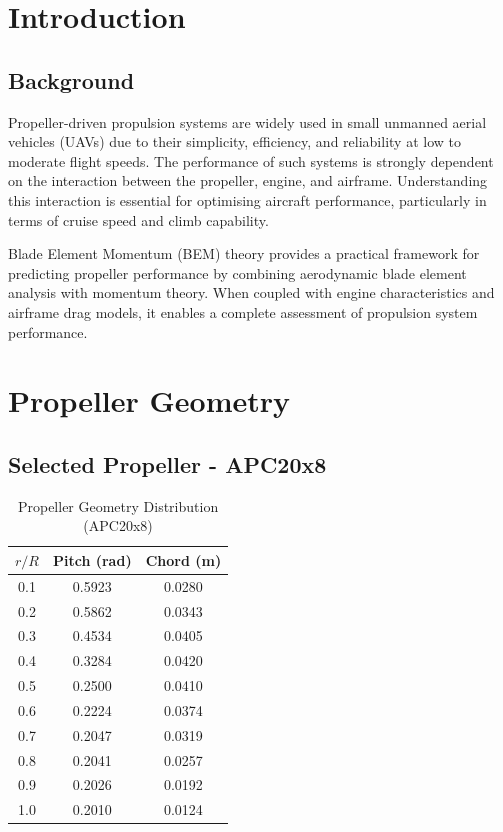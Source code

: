 \documentclass[a4paper,12pt]{article} %
\begin{document}
\tableofcontents
\newpage
\listoffigures
\listoftables
\newpage


\section{Introduction}
\subsection{Background}
Propeller-driven propulsion systems are widely used in small unmanned aerial vehicles (UAVs) due to their simplicity, efficiency, and reliability at low to moderate flight speeds. The performance of such systems is strongly dependent on the interaction between the propeller, engine, and airframe. Understanding this interaction is essential for optimising aircraft performance, particularly in terms of cruise speed and climb capability.

Blade Element Momentum (BEM) theory provides a practical framework for predicting propeller performance by combining aerodynamic blade element analysis with momentum theory. When coupled with engine characteristics and airframe drag models, it enables a complete assessment of propulsion system performance.

\section{Propeller Geometry}
\subsection{Selected Propeller - APC20x8}
\begin{table}[H]
\centering
\caption{Propeller Geometry Distribution (APC20x8)}
\begin{tabular}{ccc}
\toprule
$r/R$ & Pitch (rad) & Chord (m) \\
\midrule
0.1 & 0.5923 & 0.0280 \\
0.2 & 0.5862 & 0.0343 \\
0.3 & 0.4534 & 0.0405 \\
0.4 & 0.3284 & 0.0420 \\
0.5 & 0.2500 & 0.0410 \\
0.6 & 0.2224 & 0.0374 \\
0.7 & 0.2047 & 0.0319 \\
0.8 & 0.2041 & 0.0257 \\
0.9 & 0.2026 & 0.0192 \\
1.0 & 0.2010 & 0.0124 \\
\bottomrule
\end{tabular}
\end{table}
\end{document}

